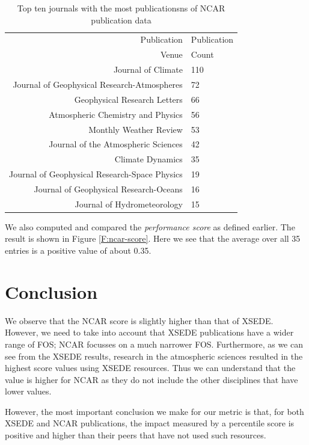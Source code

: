 \documentclass[10pt, conference, compsocconf]{IEEEtran}
\begin{document}
\begin{table}[h]
\caption{Top ten journals with the most publicationsns of NCAR
  publication data}
\label{T:ncar-pub-count-venue}
{\small
\begin{tabular}{rl}
Publication & Publication\\
Venue & Count \\
\hline
 Journal of Climate & 110	\\
 Journal of Geophysical Research-Atmospheres & 72	\\
 Geophysical Research Letters & 66	\\
 Atmospheric Chemistry and Physics & 56	\\
 Monthly Weather Review & 53	\\
 Journal of the Atmospheric Sciences & 42	\\
 Climate Dynamics & 35	\\
 Journal of Geophysical Research-Space Physics & 19	\\
 Journal of Geophysical Research-Oceans & 16	\\
 Journal of Hydrometeorology & 15	\\
\end{tabular}
}
\end{table}

We also computed and compared the \emph{performance score} as defined earlier. The result is shown in Figure \ref{F:ncar-score}. Here we see that the average over all 35 entries is a positive value of about 0.35. 

\section{Conclusion} \label{S:conclusion}

We observe that the NCAR score is slightly higher than that of XSEDE. However, we need to take into account that XSEDE publications have a wider range of FOS; NCAR focusses on a much narrower FOS. Furthermore, as we can see from the XSEDE results, research in the atmospheric sciences resulted in the highest score values using XSEDE resources. Thus we can understand that the value is higher for NCAR as they do not include the other disciplines that have lower values.

However, the most important conclusion we make for our metric is that, for both XSEDE and NCAR publications, the impact measured by a percentile score is positive and higher than their peers that have not used such resources. 
\end{document}
